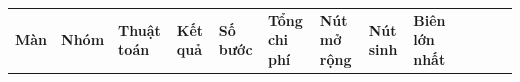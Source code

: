 {\def\LTcaptype{none} %
\begin{longtable}[]{@{}
  >{\raggedright\arraybackslash}p{}
  >{\raggedright\arraybackslash}p{}
  >{\raggedright\arraybackslash}p{}
  >{\raggedright\arraybackslash}p{}
  >{\raggedright\arraybackslash}p{}
  >{\raggedright\arraybackslash}p{}
  >{\raggedright\arraybackslash}p{}
  >{\raggedright\arraybackslash}p{}
  >{\raggedright\arraybackslash}p{}
  >{\raggedright\arraybackslash}p{}
  >{\raggedright\arraybackslash}p{}
  >{\raggedright\arraybackslash}p{}
  >{\raggedright\arraybackslash}p{}@{}}
\toprule\noalign{}
\rowcolor{tablehead}\begin{minipage}[b]{\linewidth}\raggedright
\textbf{Màn}
\end{minipage} & \begin{minipage}[b]{\linewidth}\raggedright
\textbf{Nhóm}
\end{minipage} & \begin{minipage}[b]{\linewidth}\raggedright
\textbf{Thuật toán}
\end{minipage} & \begin{minipage}[b]{\linewidth}\raggedright
\textbf{Kết quả}
\end{minipage} & \begin{minipage}[b]{\linewidth}\raggedright
\textbf{Số bước}
\end{minipage} & \begin{minipage}[b]{\linewidth}\raggedright
\textbf{Tổng chi phí}
\end{minipage} & \begin{minipage}[b]{\linewidth}\raggedright
\textbf{Nút mở rộng}
\end{minipage} & \begin{minipage}[b]{\linewidth}\raggedright
\textbf{Nút sinh}
\end{minipage} & \begin{minipage}[b]{\linewidth}\raggedright
\textbf{Biên lớn nhất}
\end{minipage} & \begin{minipage}[b]{\linewidth}\raggedright

\end{minipage}
\end{longtable}}
